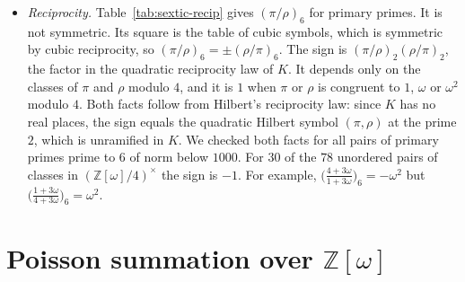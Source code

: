 \documentclass[11pt]{article}
\numberwithin{equation}{section}
\newcommand{\N}{\mathrm N}
\newcommand{\OO}{\mathbb Z[\omega]}
\theoremstyle{definition}
\theoremstyle{remark}
\begin{document}
\begin{itemize}
\begin{itemize}
$\bigl(\frac3{1+3\omega}\bigr)_6=-\omega^2$, whose cube is $-1=\bigl(\frac37\bigr)$.
\item For a split prime, $\N\pi=p$, the entry for $2$ is $\pm1$ exactly when $2$ is a cube modulo $p$, that is,
when $p=x^2+27y^2$ (\S\ref{sec:gauss}): $p=31,43,109$ in this table. The inert rows also have entry $1$
for $2$, by \eqref{eq:inertrational}, but the representation criterion does not apply to them.
\item Since $3=-\omega^2\lambda^2$ and $-\omega^2=1+\omega$, the column of $3$ is the column of
$1+\omega$ times the square of the column of $\lambda$.
\end{itemize}
\item \emph{Reciprocity.} Table~\ref{tab:sextic-recip} gives $(\pi/\rho)_6$ for primary primes. It is not
symmetric. Its square is the table of cubic symbols, which is symmetric by cubic reciprocity, so
$(\pi/\rho)_6=\pm(\rho/\pi)_6$. The sign is $(\pi/\rho)_2(\rho/\pi)_2$, the factor in the quadratic
reciprocity law of $K$. It depends only on the classes of $\pi$ and $\rho$ modulo $4$, and it is $1$ when
$\pi$ or $\rho$ is congruent to $1$, $\omega$ or $\omega^2$ modulo $4$. Both facts follow from Hilbert's
reciprocity law: since $K$ has no real places, the sign equals the quadratic Hilbert symbol $(\pi,\rho)$ at
the prime $2$, which is unramified in $K$. We checked both facts for all pairs of primary primes prime to $6$
of norm below $1000$. For $30$ of the $78$ unordered pairs of classes in $(\OO/4)^\times$ the sign is $-1$. For
example, $\bigl(\frac{4+3\omega}{1+3\omega}\bigr)_6=-\omega^2$ but $\bigl(\frac{1+3\omega}{4+3\omega}\bigr)_6=\omega^2$.
\end{itemize}

\section{Poisson summation over \texorpdfstring{$\OO$}{Z[omega]}}\label{sec:poisson}
\end{document}
